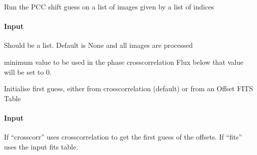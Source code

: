 \documentclass[letterpaper,10pt,english]{sphinxmanual}
\begin{document}
\begin{fulllineitems}
\begin{fulllineitems}
\label{\detokenize{api/pymusepipe:pymusepipe.align_pipe.AlignMuseDataset.get_shift_from_pcc_listima}}
\pysigstartsignatures
{}
\pysigstopsignatures
\sphinxAtStartPar
Run the PCC shift guess on a list of images given by a list
of indices


\paragraph{Input}
\label{\detokenize{api/pymusepipe:id10}}\begin{description}
\sphinxAtStartPar
Should be a list. Default is None
and all images are processed

\sphinxAtStartPar
minimum value to be used in the phase cross\sphinxhyphen{}correlation
Flux below that value will be set to 0.

\end{description}

\end{fulllineitems}


\begin{fulllineitems}
\label{\detokenize{api/pymusepipe:pymusepipe.align_pipe.AlignMuseDataset.init_guess_offset}}
\pysigstartsignatures
{}
\pysigstopsignatures
\sphinxAtStartPar
Initialise first guess, either from cross\sphinxhyphen{}correlation (default)
or from an Offset FITS Table


\paragraph{Input}
\label{\detokenize{api/pymusepipe:id11}}\begin{description}
\sphinxAtStartPar
If “crosscorr” uses cross\sphinxhyphen{}correlation to get the first guess
of the offsets. If “fits” uses the input fits table.


\end{description}
\end{fulllineitems}
\end{fulllineitems}
\end{document}
